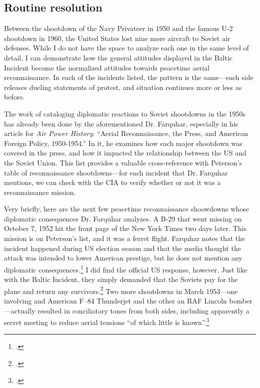 \documentclass[12pt]{article}
\begin{document}
\subsection{Routine resolution}
Between the shootdown of the Navy Privateer in 1950 and the famous U-2 shootdown in 1960, the United States lost nine more aircraft to Soviet air defenses. While I do not have the space to analyze each one in the same level of detail, I can demonstrate how the general attitudes displayed in the Baltic Incident become the normalized attitudes towards peacetime aerial reconnaissance. In each of the incidents listed, the pattern is the same---each side releases dueling statements of protest, and situation continues more or less as before.

The work of cataloging diplomatic reactions to Soviet shootdowns in the 1950s has already been done by the aforementioned Dr. Farquhar, especially in his article for \emph{Air Power History}: ``Aerial Reconnaissance, the Press, and American Foreign Policy, 1950-1954.'' In it, he examines how each major shootdown was covered in the press, and how it impacted the relationship between the US and the Soviet Union. This list provides a valuable cross-reference with Peterson's table of reconnaissance shootdowns---for each incident that Dr. Farquhar mentions, we can check with the CIA to verify whether or not it was a reconnaissance mission.

Very briefly, here are the next few peacetime reconnaissance shoowdowns whose diplomatic consequences Dr. Farquhar analyzes. A B-29 that went missing on October 7, 1952 hit the front page of the New York Times two days later. This mission is on Peterson's list, and it was a ferret flight. Farquhar notes that the incident happened during US election season and that the media thought the attack was intended to lower American prestige, but he does not mention any diplomatic consequences.\footcite[p.~43-44]{farquhar_aerial_2015} I did find the official US response, however. Just like with the Baltic Incident, they simply demanded that the Soviets pay for the plane and return any survivors.\footcite{the_new_york_times_u.s._1952} Two more shootdowns in March 1953---one involving and American F–84 Thunderjet and the other an RAF Lincoln bomber---actually resulted in conciliatory tones from both sides, including apparently a secret meeting to reduce aerial tensions ``of which little is known''.\footcite[p.~45]{farquhar_aerial_2015}
\end{document}
